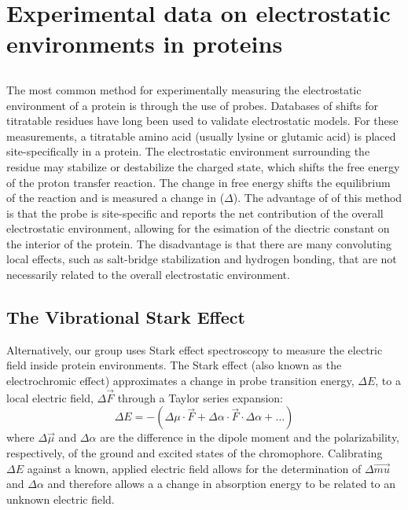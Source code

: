 \section{Experimental data on electrostatic environments in proteins}

\subsection{\pKa{}}

The most common method for experimentally measuring the electrostatic environment of a protein is through the use of \pKa{} probes. 
Databases of \pKa{} shifts for titratable residues have long been used to validate electrostatic models. 
For these measurements, a titratable amino acid (usually lysine or glutamic acid) is placed site-specifically in a protein. 
The electrostatic environment surrounding the residue may stabilize or destabilize the charged state, which shifts the free energy of the proton transfer reaction. 
The change in free energy shifts the equilibrium of the reaction and is measured a change in \pKa{} ($\Delta$\pKa{}).  
The advantage of of this method is that the probe is site-specific and reports the net contribution of the overall electrostatic environment, allowing for the esimation of the diectric constant on the interior of the protein. 
The disadvantage is that there are many convoluting local effects, such as salt-bridge stabilization and hydrogen bonding, that are not necessarily related to the overall electrostatic environment. 

\subsection{The Vibrational Stark Effect}

Alternatively, our group uses Stark effect spectroscopy to measure the electric field inside protein environments. 
The Stark effect (also known as the electrochromic effect) approximates a change in probe transition energy, $\Delta E$, to a local electric field, $\Delta \vec{F}$ through a Taylor series expansion:
\begin{equation}
    \Delta E = -(\Delta \mu \cdot \vec{F} + \Delta \alpha \cdot \vec{F} \cdot \Delta \alpha + \ldots)
    \label{eq:intro-stark}
\end{equation}
where $\Delta \vec{\mu}$ and $\Delta \alpha$ are the difference in the dipole moment and the polarizability, respectively, of the ground and excited states of the chromophore. 
Calibrating $\Delta E$ against a known, applied electric field allows for the determination of $\Delta \vec{mu}$ and $\Delta \alpha$ and therefore allows a a change in absorption energy to be related to an unknown electric field. 

